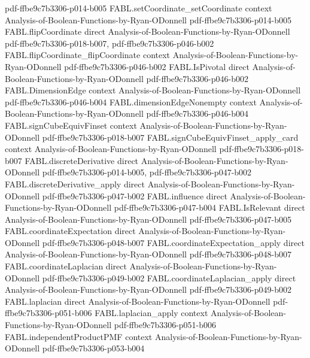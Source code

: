 \begin{theorem}
  {pdf-ffbe9c7b3306-p014-b005}
\proofstep
  {FABL.setCoordinate_setCoordinate}
  {context}
  {Analysis-of-Boolean-Functions-by-Ryan-ODonnell}
  {pdf-ffbe9c7b3306-p014-b005}
\proofstep
  {FABL.flipCoordinate}
  {direct}
  {Analysis-of-Boolean-Functions-by-Ryan-ODonnell}
  {pdf-ffbe9c7b3306-p018-b007,
    pdf-ffbe9c7b3306-p046-b002}
\proofstep
  {FABL.flipCoordinate_flipCoordinate}
  {context}
  {Analysis-of-Boolean-Functions-by-Ryan-ODonnell}
  {pdf-ffbe9c7b3306-p046-b002}
\proofstep
  {FABL.IsPivotal}
  {direct}
  {Analysis-of-Boolean-Functions-by-Ryan-ODonnell}
  {pdf-ffbe9c7b3306-p046-b002}
\proofstep
  {FABL.DimensionEdge}
  {context}
  {Analysis-of-Boolean-Functions-by-Ryan-ODonnell}
  {pdf-ffbe9c7b3306-p046-b004}
\proofstep
  {FABL.dimensionEdgeNonempty}
  {context}
  {Analysis-of-Boolean-Functions-by-Ryan-ODonnell}
  {pdf-ffbe9c7b3306-p046-b004}
\proofstep
  {FABL.signCubeEquivFinset}
  {context}
  {Analysis-of-Boolean-Functions-by-Ryan-ODonnell}
  {pdf-ffbe9c7b3306-p018-b007}
\proofstep
  {FABL.signCubeEquivFinset_apply_card}
  {context}
  {Analysis-of-Boolean-Functions-by-Ryan-ODonnell}
  {pdf-ffbe9c7b3306-p018-b007}
\proofstep
  {FABL.discreteDerivative}
  {direct}
  {Analysis-of-Boolean-Functions-by-Ryan-ODonnell}
  {pdf-ffbe9c7b3306-p014-b005,
    pdf-ffbe9c7b3306-p047-b002}
\proofstep
  {FABL.discreteDerivative_apply}
  {direct}
  {Analysis-of-Boolean-Functions-by-Ryan-ODonnell}
  {pdf-ffbe9c7b3306-p047-b002}
\proofstep
  {FABL.influence}
  {direct}
  {Analysis-of-Boolean-Functions-by-Ryan-ODonnell}
  {pdf-ffbe9c7b3306-p047-b004}
\proofstep
  {FABL.IsRelevant}
  {direct}
  {Analysis-of-Boolean-Functions-by-Ryan-ODonnell}
  {pdf-ffbe9c7b3306-p047-b005}
\proofstep
  {FABL.coordinateExpectation}
  {direct}
  {Analysis-of-Boolean-Functions-by-Ryan-ODonnell}
  {pdf-ffbe9c7b3306-p048-b007}
\proofstep
  {FABL.coordinateExpectation_apply}
  {direct}
  {Analysis-of-Boolean-Functions-by-Ryan-ODonnell}
  {pdf-ffbe9c7b3306-p048-b007}
\proofstep
  {FABL.coordinateLaplacian}
  {direct}
  {Analysis-of-Boolean-Functions-by-Ryan-ODonnell}
  {pdf-ffbe9c7b3306-p049-b002}
\proofstep
  {FABL.coordinateLaplacian_apply}
  {direct}
  {Analysis-of-Boolean-Functions-by-Ryan-ODonnell}
  {pdf-ffbe9c7b3306-p049-b002}
\proofstep
  {FABL.laplacian}
  {direct}
  {Analysis-of-Boolean-Functions-by-Ryan-ODonnell}
  {pdf-ffbe9c7b3306-p051-b006}
\proofstep
  {FABL.laplacian_apply}
  {context}
  {Analysis-of-Boolean-Functions-by-Ryan-ODonnell}
  {pdf-ffbe9c7b3306-p051-b006}
\proofstep
  {FABL.independentProductPMF}
  {context}
  {Analysis-of-Boolean-Functions-by-Ryan-ODonnell}
  {pdf-ffbe9c7b3306-p053-b004}

\end{theorem}
